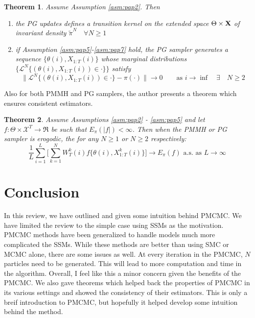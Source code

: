 \documentclass{article}\usepackage[]{graphicx}\usepackage[]{color}
\newtheorem{theorem}{Theorem}
\theoremstyle{definition}
\begin{document}
\begin{theorem}
Assume Assumption \ref{asm:pap2}. Then
\begin{enumerate}
  \item the PG updates defines a transition kernel on the extended space $\Theta \times {\bf X}$ of invariant density $\tilde{\pi}^N \quad \forall N \geq 1$
  \item if Assumption \ref{asm:pap5}-\ref{asm:pap7} hold, the PG sampler generates a sequence $\{ \theta(i), X_{1:T}(i) \}$ whose marginal distributions $\{ \mathcal{L}^N \{ (\theta(i), X_{1:T}(i)) \in \cdot \} \}$ satisfy 
    \begin{equation*}
    \| \mathcal{L}^N \{ (\theta(i), X_{1:T}(i)) \in \cdot \} - \pi(\cdot) \| \rightarrow 0 \quad \quad \text{as }i \rightarrow \inf \quad \exists \quad N \geq 2
    \end{equation*}
\end{enumerate}
\end{theorem}


Also for both PMMH and PG samplers, the author presents a theorem which ensures consistent estimators.
\begin{theorem}
Assume Assumptions \ref{asm:pap2} - \ref{asm:pap5} and let $f:\Theta \times \mathcal{X}^T \rightarrow \Re$ be such that $E_\pi(|f|) < \infty$. Then when the PMMH or PG sampler is erogodic, the for any $N \geq 1$ or $N \geq 2$ respectively:
\begin{equation*}
  \frac{1}{L} \sum \limits_{i=1}^L \Big[ \sum \limits_{k=1}^N W^k_T(i) f\{ \theta(i), X^k_{1:T}(i) \} \Big] \rightarrow E_\pi(f) \text{ a.s. as }L\rightarrow \infty
\end{equation*}
\end{theorem}


\section{Conclusion}
 In this review, we have outlined and given some intuition behind PMCMC. We have limited the review to the simple case using SSMs as the motivation. PMCMC methods have been generalized to handle models much more complicated the SSMs. While these methods are better than using SMC or MCMC alone, there are some issues as well. At every iteration in the PMCMC, $N$ particles need to be generated. This will lead to more computation and time in the algorithm. Overall, I feel like this a minor concern given the benefits of the PMCMC. We also gave theorems which helped back the properties of PMCMC in its various settings and showed the consistency of their estimators. This is only a breif introduction to PMCMC, but hopefully it helped develop some intuition behind the method.









\nocite{*}



\end{document}

